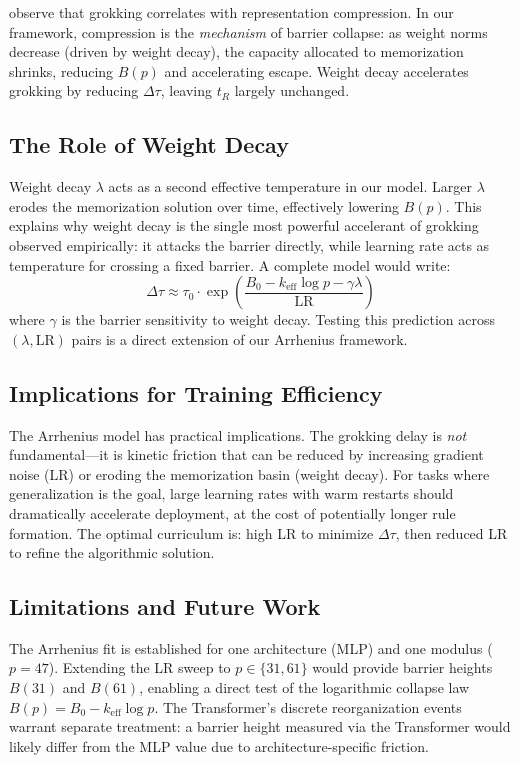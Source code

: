 \documentclass[11pt,twocolumn]{article}
\begin{document}
\citet{liu2022towards} observe that grokking correlates with representation compression. In our framework, compression is the \emph{mechanism} of barrier collapse: as weight norms decrease (driven by weight decay), the capacity allocated to memorization shrinks, reducing $B(p)$ and accelerating escape. Weight decay accelerates grokking by reducing $\Delta\tau$, leaving $t_R$ largely unchanged.

\subsection{The Role of Weight Decay}

Weight decay $\lambda$ acts as a second effective temperature in our model. Larger $\lambda$ erodes the memorization solution over time, effectively lowering $B(p)$. This explains why weight decay is the single most powerful accelerant of grokking observed empirically: it attacks the barrier directly, while learning rate acts as temperature for crossing a fixed barrier. A complete model would write:
$$\Delta\tau \approx \tau_0 \cdot \exp\!\left(\frac{B_0 - k_{\mathrm{eff}}\log p - \gamma \lambda}{\mathrm{LR}}\right)$$
where $\gamma$ is the barrier sensitivity to weight decay. Testing this prediction across $(\lambda, \mathrm{LR})$ pairs is a direct extension of our Arrhenius framework.

\subsection{Implications for Training Efficiency}

The Arrhenius model has practical implications. The grokking delay is \emph{not} fundamental---it is kinetic friction that can be reduced by increasing gradient noise (LR) or eroding the memorization basin (weight decay). For tasks where generalization is the goal, large learning rates with warm restarts should dramatically accelerate deployment, at the cost of potentially longer rule formation. The optimal curriculum is: high LR to minimize $\Delta\tau$, then reduced LR to refine the algorithmic solution.

\subsection{Limitations and Future Work}

The Arrhenius fit is established for one architecture (MLP) and one modulus ($p=47$). Extending the LR sweep to $p \in \{31, 61\}$ would provide barrier heights $B(31)$ and $B(61)$, enabling a direct test of the logarithmic collapse law $B(p) = B_0 - k_{\mathrm{eff}} \log p$. The Transformer's discrete reorganization events warrant separate treatment: a barrier height measured via the Transformer would likely differ from the MLP value due to architecture-specific friction.
\end{document}
